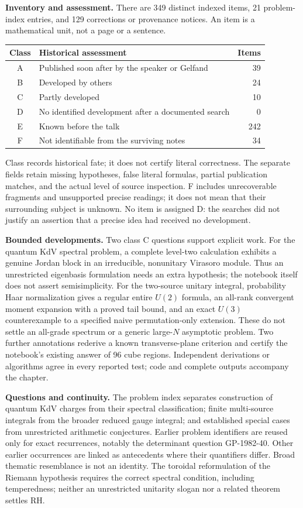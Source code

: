 \medskip
\noindent\textbf{Inventory and assessment.}
There are 349 distinct indexed items, 21
problem-index entries, and 129 corrections or provenance notices.
An item is a mathematical unit, not a page or a sentence.
\begin{center}
\begin{tabular}{cl r}
\hline
Class & Historical assessment & Items\\
\hline
A & Published soon after by the speaker or Gelfand & 39 \\
B & Developed by others & 24 \\
C & Partly developed & 10 \\
D & No identified development after a documented search & 0 \\
E & Known before the talk & 242 \\
F & Not identifiable from the surviving notes & 34 \\
\hline
\end{tabular}
\end{center}
Class records historical fate; it does not certify literal correctness.
The separate fields retain missing hypotheses, false literal formulas,
partial publication matches, and the actual level of source inspection.
F includes unrecoverable fragments and unsupported precise readings;
it does not mean that their surrounding subject is unknown.
No item is assigned D: the searches did not justify an assertion that a precise idea had received no development.

\medskip
\noindent\textbf{Bounded developments.}
Two class C questions support explicit work. For the quantum KdV spectral
problem, a complete level-two calculation exhibits a genuine Jordan block
in an irreducible, nonunitary Virasoro module. Thus an unrestricted
eigenbasis formulation needs an extra hypothesis; the notebook itself
does not assert semisimplicity. For the two-source unitary integral,
probability Haar normalization gives a regular entire \(U(2)\) formula,
an all-rank convergent moment expansion with a proved tail bound, and
an exact \(U(3)\) counterexample to a specified naive permutation-only
extension. These do not settle an all-grade spectrum or a generic
large-\(N\) asymptotic problem. Two further annotations rederive a known
transverse-plane criterion and certify the notebook's existing answer
of 96 cube regions. Independent derivations or algorithms agree in
every reported test; code and complete outputs accompany the chapter.

\medskip
\noindent\textbf{Questions and continuity.}
The problem index separates construction of quantum KdV charges from
their spectral classification; finite multi-source integrals from the
broader reduced gauge integral; and established special cases from
unrestricted arithmetic conjectures. Earlier problem identifiers are
reused only for exact recurrences, notably the determinant question
GP-1982-40. Other earlier occurrences are linked as antecedents where
their quantifiers differ. Broad thematic resemblance is not an identity.
The toroidal reformulation of the Riemann hypothesis requires the
correct spectral condition, including temperedness; neither an
unrestricted unitarity slogan nor a related theorem settles RH.

